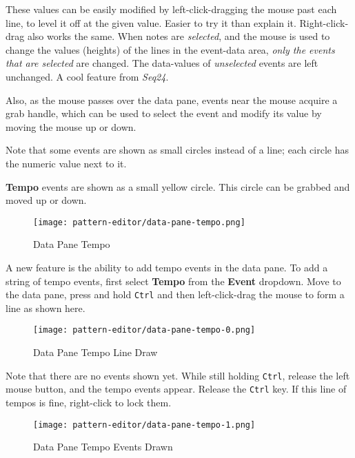    These values can be easily modified by
   left-click-dragging the
   mouse past each line, to level it off at the given value.
   Easier to try it than explain it.
   Right-click-drag also works the same.
   When notes are \textsl{selected}, and the
   mouse is used to change the values (heights) of the lines in the event-data
   area, \textsl{only the events that are selected} are changed.
   The data-values of \textsl{unselected} events are left unchanged.
   A cool feature from \textsl{Seq24}.

   Also, as the mouse passes over the data pane, events near the mouse
   acquire a grab handle, which can be used to select the event
   and modify its value by moving the mouse up or down.

   Note that some events are shown as small circles instead of a line; each
   circle has the numeric value next to it.

   \textbf{Tempo}
   events are shown as a small yellow circle.
   This circle can be grabbed and moved up or down.

\begin{figure}[H]
   \centering 
   \texttt{[image: pattern-editor/data-pane-tempo.png]}
   \caption{Data Pane Tempo}
   \label{fig:pattern_editor_data_pane_tempo}
\end{figure}

   A new feature is the ability to
   add tempo events in the data pane.
   To add a string of tempo events, first select \textbf{Tempo}
   from the \textbf{Event} dropdown.
   Move to the data pane, press and hold \texttt{Ctrl}
   and then left-click-drag the mouse to form a line
   as shown here.

\begin{figure}[H]
   \centering 
   \texttt{[image: pattern-editor/data-pane-tempo-0.png]}
   \caption{Data Pane Tempo Line Draw}
   \label{fig:pattern_editor_data_pane_tempo_line_draw}
\end{figure}

   Note that there are no events shown yet.
   While still holding \texttt{Ctrl}, release the left mouse button,
   and the tempo events appear.
   Release the \texttt{Ctrl} key.
   If this line of tempos is fine, right-click to lock them.

\begin{figure}[H]
   \centering 
   \texttt{[image: pattern-editor/data-pane-tempo-1.png]}
   \caption{Data Pane Tempo Events Drawn}
   \label{fig:pattern_editor_data_pane_tempo_events_drawn}
\end{figure}

